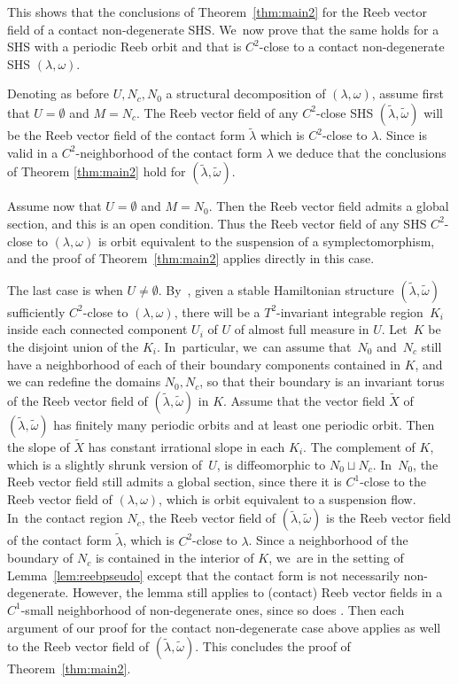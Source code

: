 This shows that the conclusions of Theorem~\ref{thm:main2} for the Reeb vector field of a contact non-degenerate SHS. We~now prove that the same holds for a SHS with a periodic Reeb orbit and that is $C^2$-close to a contact non-degenerate SHS $(\lambda,\omega)$.

Denoting as before $U,N_c, N_0$ a structural decomposition of $(\lambda,\omega)$, assume first that $U=\emptyset$ and $M=N_c$. The Reeb vector field of any $C^2$-close SHS $(\widetilde \lambda, \widetilde \omega)$ will be the Reeb vector field of the contact form $\widetilde \lambda$ which is $C^2$-close to $\lambda$. Since \cite[Th.\,1.2]{CDR} is valid in a $C^2$-neighborhood of the contact form $\lambda$ we deduce that the conclusions of Theorem \ref{thm:main2} hold for $(\widetilde \lambda, \widetilde \omega)$.

Assume now that $U=\emptyset$ and $M=N_0$. Then the Reeb vector field admits a global section, and this is an open condition. Thus the Reeb vector field of any SHS $C^2$-close to $(\lambda,\omega)$ is orbit equivalent to the suspension of a symplectomorphism, and the proof of Theorem~\ref{thm:main2} applies directly in this case.

The last case is when $U\neq \emptyset$. By~\cite[Th.\,3.7]{CV1}, given a stable Hamiltonian structure $(\widetilde \lambda, \widetilde \omega)$ sufficiently $C^2$-close to $(\lambda,\omega)$, there will be a $T^2$-invariant integrable region~$K_i$ inside each connected component $U_i$ of $U$ of almost full measure in $U$. Let~$K$ be the disjoint union of the $K_i$. In~particular, we~can assume that~$N_0$ and~$N_c$ still have a neighborhood of each of their boundary components contained in $K$, and we can redefine the domains $N_0, N_c$, so that their boundary is an invariant torus of the Reeb vector field of $(\widetilde \lambda, \widetilde \omega)$ in $K$. Assume that the vector field $\widetilde X$ of $(\widetilde \lambda, \widetilde \omega)$ has finitely many periodic orbits and at least one periodic orbit. Then the slope of $\widetilde X$ has constant irrational slope in each $K_i$. The complement of $K$, which is a slightly shrunk version of~$U$, is diffeomorphic to $N_0\sqcup N_c$. In~$N_0$, the Reeb vector field still admits a global section, since there it is $C^1$-close to the Reeb vector field of $(\lambda,\omega)$, which is orbit equivalent to a suspension flow. In~the contact region $N_c$, the Reeb vector field of $(\widetilde \lambda, \widetilde \omega)$ is the Reeb vector field of the contact form $\widetilde \lambda$, which is $C^2$-close to $\lambda$. Since a neighborhood of the boundary of $N_c$ is contained in the interior of $K$, we~are in the setting of Lemma~\ref{lem:reebpseudo} except that the contact form is not necessarily non-degenerate. However, the lemma still applies to (contact) Reeb vector fields in a $C^1$-small neighborhood of non-degenerate ones, since so does \cite[Th.\,1.2]{CDR}. Then each argument of our proof for the contact non-degenerate case above applies as well to the Reeb vector field of $(\widetilde \lambda, \widetilde \omega)$. This concludes the proof of Theorem~\ref{thm:main2}.


